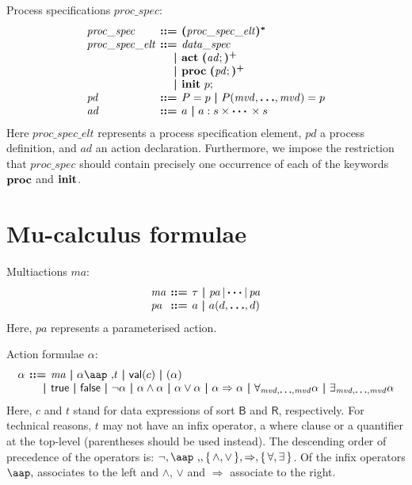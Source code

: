 \documentclass[a4paper,fleqn,10pt]{article}
\makeatletter
\newcommand{\f}[1]{\ensuremath{\mathit{#1}}}
\newcommand{\sbool}{\ensuremath{\mathsf{B}}}
\newcommand{\sreal}{\ensuremath{\mathsf{R}}}
\newenvironment{tightarray}[1]
  {\setlength{\arraycolsep}{2pt}%
   \begin{array}{@{}#1@{}}%
  }
  {\end{array}%
  }
\newcommand{\set}[1]{\ensuremath{\{\,#1\,\}}}
\newcommand{\at}[1]{\mbox{\aap ,} #1}
\newcommand{\limp}{\ensuremath{\Rightarrow}}
\newcommand{\mb}[1]{\text{\boldmath$#1$}}
\newcommand{\kwact}{{\bf act}}
\newcommand{\kwproc}{{\bf proc}}
\newcommand{\kwinit}{{\bf init}}
\makeatother
\begin{document}
Process specifications $\f{proc\_spec}$:
\[\begin{tightarray}{lrl}
\f{proc\_spec}      & \mb{::=} & \mb{(}\f{proc\_spec\_elt}\mb{)^{*}}\\
\f{proc\_spec\_elt} & \mb{::=} & \f{data\_spec}\\
                    & \mb{|}   & \kwact\ \mb{(}\f{ad};\mb{)^{+}}\\
                    & \mb{|}   & \kwproc\ \mb{(}\f{pd};\mb{)^{+}}\\
                    & \mb{|}   & \kwinit\ p;\\
\f{pd}              & \mb{::=} & P = p\ \mb{|}\ P(\f{mvd},\mb{\ldots},\f{mvd}) = p\\
\f{ad}              & \mb{::=} & a\ \mb{|}\ a: s \times \mb{\cdots} \times s
\end{tightarray}\]
Here $\f{proc\_spec\_elt}$ represents a process specification element, $\f{pd}$ a process definition, and $\f{ad}$ an action declaration. Furthermore, we impose the restriction that $\f{proc\_spec}$ should contain precisely one occurrence of each of the keywords $\kwproc$ and $\kwinit$.

\section{Mu-calculus formulae}

Multiactions $\f{ma}$:
\[\begin{tightarray}{lrl}
\f{ma} & \mb{::=} & \tau\ \mb{|}\ \f{pa}\,|\,\mb{\cdots} |\,\f{pa}\\
\f{pa} & \mb{::=} & a\ \mb{|}\ a(d,\mb{\ldots},d)
\end{tightarray}\]
Here, $\f{pa}$ represents a parameterised action.

Action formulae $\alpha$:
\[\begin{tightarray}{lrl}
\alpha & \mb{::=} & \f{ma}\ \mb{|}\ 
                    \alpha\at t\ \mb{|}\ 
                    \mathsf{val}(c)\ \mb{|}\ 
                    ( \alpha )\\ 
       & \mb{|}   & \mathsf{true}\ \mb{|}\ 
                    \mathsf{false}\ \mb{|}\ 
                    \neg \alpha\ \mb{|}\ 
                    \alpha \land \alpha\ \mb{|}\ 
                    \alpha \lor  \alpha\ \mb{|}\ 
                    \alpha \limp \alpha\ \mb{|}\ 
                    \forall_{\f{mvd},\mb{\ldots},\f{mvd}} \alpha\ \mb{|}\ 
                    \exists_{\f{mvd},\mb{\ldots},\f{mvd}} \alpha\\
\end{tightarray}\]
Here, $c$ and $t$ stand for data expressions of sort $\sbool$ and $\sreal$,
respectively.
For technical reasons, $t$ may not have an infix operator, a where
clause or a quantifier at the top-level (parentheses should be used
instead).
The descending order of precedence of the operators is: $\neg,
\at, \set{\land,\lor}, \limp, \set{\forall, \exists}$.  Of the infix operators
$\at$ associates to the left and $\land$, $\lor$ and $\limp$ associate to the
right.
\end{document}
